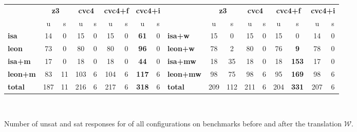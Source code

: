 \documentclass[runningheads,a4paper]{llncs}
\newcommand{\conv}{\mathcal{W}}
\begin{document}
\begin{figure}
\centering
{
\begin{tabular}{|l|cc|cc|cc|cc|l|cc|cc|cc|cc|}
\hline                                                                
  & \multicolumn{2}{c|}{{\bf z3}}     & \multicolumn{2}{c|}{{\bf cvc4}}     & \multicolumn{2}{c|}{{\bf cvc4+f}}     & \multicolumn{2}{c|}{{\bf cvc4+i}}     & & \multicolumn{2}{c|}{{\bf z3}}     & \multicolumn{2}{c|}{{\bf cvc4}}     & \multicolumn{2}{c|}{{\bf cvc4+f}}     & \multicolumn{2}{c|}{{\bf cvc4+i}}     
\\                                                                    
  & u & s & u & s & u & s & u & s & & u & s & u & s & u & s & u & s 
\\                                                                    
\hline                                                                    
{\bf isa} & 14  & 0 & 15  & 0 & 15  & 0 & {\bf 61}  & 0 & {\bf isa+w} & 15  & 0 & 15  & 0 & 15  & 0 & 14  & 0
\\                                                                  
{\bf leon}  & 73  & 0 & 80  & 0 & 80  & 0 & {\bf 96}  & 0 & {\bf leon+w}  & 78  & 2 & 80  & 0 & 76  & {\bf 9} & 78  & 0
\\                                                                   
{\bf isa+m} & 17  & 0 & 18  & 0 & 18  & 0 & {\bf 44}  & 0 & {\bf isa+mw}  & 18  & 35  & 18  & 0 & 18  & {\bf 153} & 17  & 0
\\                                                                  
{\bf leon+m}  & 83  & 11  & 103 & 6 & 104 & 6 & {\bf 117} & 6 & {\bf leon+mw} & 98  & 75  & 98  & 6 & 95  & {\bf 169} & 98  & 6
\\                                                                  
\hline                                                             
{\bf total} & 187 & 11  & 216 & 6 & 217 & 6 & {\bf 318} & 6 & {\bf total} & 209 & 112 & 211 & 6 & 204 & {\bf 331} & 207 & 6
\\                                                                                            
\hline                                                                                            
\end{tabular}
\\
}
\caption{Number of unsat and sat responses for of all configurations on benchmarks 
before and after the translation $\conv$.}
\label{fig:results}
\end{figure}
\end{document}
